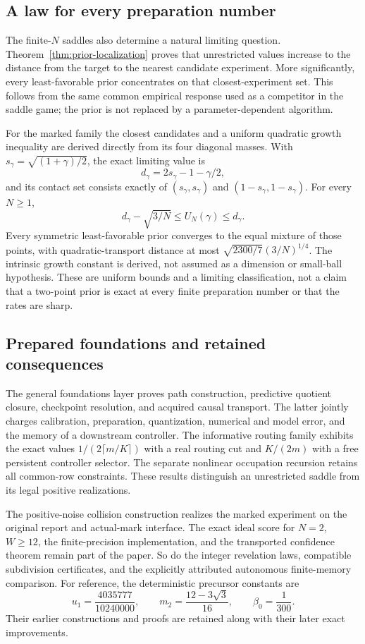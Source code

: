 \documentclass[11pt]{amsart}
\theoremstyle{definition}\newtheorem{definition}[theorem]{Definition}
\theoremstyle{remark}\newtheorem{remark}[theorem]{Remark}
\newcommand{\1}{\mathbf 1}
\begin{document}
\subsection{A law for every preparation number}
The finite-$N$ saddles also determine a natural limiting question.
Theorem~\ref{thm:prior-localization} proves that unrestricted values
increase to the distance from the target to the nearest candidate
experiment. More significantly, every least-favorable prior concentrates
on that closest-experiment set. This follows from the same common
empirical response used as a competitor in the saddle game; the prior
is not replaced by a parameter-dependent algorithm.

For the marked family the closest candidates and a uniform quadratic
growth inequality are derived directly from its four diagonal masses.
With $s_\gamma=\sqrt{(1+\gamma)/2}$, the exact limiting value is
\[
 d_\gamma=2s_\gamma-1-\gamma/2,
\]
and its contact set consists exactly of $(s_\gamma,s_\gamma)$ and
$(1-s_\gamma,1-s_\gamma)$. For every $N\ge1$,
\[
 d_\gamma-\sqrt{3/N}\le U_N(\gamma)\le d_\gamma.
\]
Every symmetric least-favorable prior converges to the equal mixture of
those points, with quadratic-transport distance at most
$\sqrt{2300/7}(3/N)^{1/4}$. The intrinsic growth constant is derived,
not assumed as a dimension or small-ball hypothesis. These are uniform
bounds and a limiting classification, not a claim that a two-point
prior is exact at every finite preparation number or that the rates
are sharp.

\subsection{Prepared foundations and retained consequences}
The general foundations layer proves path construction, predictive
quotient closure, checkpoint resolution, and acquired causal transport.
The latter jointly charges calibration, preparation, quantization,
numerical and model error, and the memory of a downstream controller.
The informative routing family exhibits the exact values
$1/(2\lceil m/K\rceil)$ with a real routing cut and $K/(2m)$ with a
free persistent controller selector. The separate nonlinear occupation
recursion retains all common-row constraints. These results distinguish
an unrestricted saddle from its legal positive realizations.

The positive-noise collision construction realizes the marked experiment
on the original report and actual-mark interface. The exact ideal score
for $N=2$, $W\ge12$, the finite-precision implementation, and the
transported confidence theorem remain part of the paper. So do the
integer revelation laws, compatible subdivision certificates, and the
explicitly attributed autonomous finite-memory comparison. For reference,
the deterministic precursor constants are
\begin{equation}\label{eq:constants}
 u_1=\frac{4035777}{10240000},\qquad
 m_2=\frac{12-3\sqrt3}{16},\qquad\beta_0=\frac1{300}.
\end{equation}
Their earlier constructions and proofs are retained along with their
later exact improvements.
\end{document}
